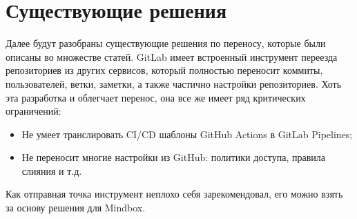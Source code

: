 \section{Существующие решения}\label{sec:existing-solutions}
Далее будут разобраны существующие решения по переносу, которые были описаны во множестве статей.
GitLab имеет встроенный инструмент переезда репозиториев из других сервисов,
который полностью переносит коммиты, пользователей, ветки, заметки, а также частично настройки репозиториев.
Хоть эта разработка и облегчает перенос, она все же имеет ряд критических ограничений:
\begin{itemize}
  \item Не умеет транслировать CI/CD шаблоны GitHub Actions в GitLab Pipelines;
  \item Не переносит многие настройки из GitHub: политики доступа, правила слияния и т.д.
\end{itemize}
Как отправная точка инструмент неплохо себя зарекомендовал, его можно взять за основу решения для Mindbox.
